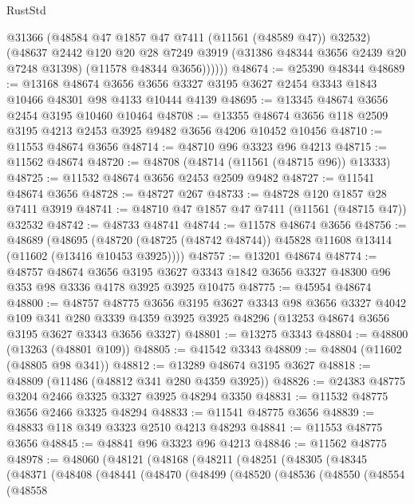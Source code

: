 \begin{lexlean}{RustStd}
\begin{coremodule}
            @31366
            (@48584 @47 @1857 @47 @7411 (@11561 (@48589 @47)) @32532)
            (@48637
              @2442
              @120
              @20
              @28
              @7249
              @3919
              (@31386 @48344 @3656 @2439 @20 @7248 @31398)
              (@11578 @48344 @3656))))))
@48674 := @25390 @48344
@48689 := @13168
    @48674
    @3656
    @3656
    @3327
    @3195
    @3627
    @2454
    @3343
    @1843
    @10466
    @48301
    @98
    @4133
    @10444
    @4139
@48695 := @13345 @48674 @3656 @2454 @3195 @10460 @10464
@48708 := @13355 @48674 @3656 @118 @2509 @3195 @4213 @2453 @3925 @9482 @3656 @4206 @10452 @10456
@48710 := @11553 @48674 @3656
@48714 := @48710 @96 @3323 @96 @4213
@48715 := @11562 @48674
@48720 := @48708 (@48714 (@11561 (@48715 @96)) @13333)
@48725 := @11532 @48674 @3656 @2453 @2509 @9482
@48727 := @11541 @48674 @3656
@48728 := @48727 @267
@48733 := @48728 @120 @1857 @28 @7411 @3919
@48741 := @48710 @47 @1857 @47 @7411 (@11561 (@48715 @47)) @32532
@48742 := @48733 @48741
@48744 := @11578 @48674 @3656
@48756 := @48689
    (@48695 (@48720 (@48725 (@48742 @48744)) @45828 @11608 @13414 (@11602 (@13416 @10453 @3925))))
@48757 := @13201 @48674
@48774 := @48757
    @48674
    @3656
    @3195
    @3627
    @3343
    @1842
    @3656
    @3327
    @48300
    @96
    @353
    @98
    @3336
    @4178
    @3925
    @3925
    @10475
@48775 := @45954 @48674
@48800 := @48757
    @48775
    @3656
    @3195
    @3627
    @3343
    @98
    @3656
    @3327
    @4042
    @109
    @341
    @280
    @3339
    @4359
    @3925
    @3925
    @48296
    (@13253 @48674 @3656 @3195 @3627 @3343 @3656 @3327)
@48801 := @13275 @3343
@48804 := @48800 (@13263 (@48801 @109))
@48805 := @41542 @3343
@48809 := @48804 (@11602 (@48805 @98 @341))
@48812 := @13289 @48674 @3195 @3627
@48818 := @48809 (@11486 (@48812 @341 @280 @4359 @3925))
@48826 := @24383 @48775 @3204 @2466 @3325 @3327 @3925 @48294 @3350
@48831 := @11532 @48775 @3656 @2466 @3325 @48294
@48833 := @11541 @48775 @3656
@48839 := @48833 @118 @349 @3323 @2510 @4213 @48293
@48841 := @11553 @48775 @3656
@48845 := @48841 @96 @3323 @96 @4213
@48846 := @11562 @48775
@48978 := @48060
    (@48121
      (@48168
        (@48211
          (@48251
            (@48305
              (@48345
                (@48371
                  (@48408
                    (@48441
                      (@48470
                        (@48499
                          (@48520
                            (@48536
                              (@48550
                                (@48554
                                  (@48558

\end{coremodule}
\end{lexlean}
